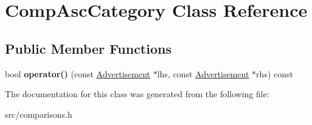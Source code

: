 \hypertarget{class_comp_asc_category}{}\section{Comp\+Asc\+Category Class Reference}
\label{class_comp_asc_category}
\subsection*{Public Member Functions}
\begin{DoxyCompactItemize}
\item 
\hypertarget{class_comp_asc_category_aa6b627570bde0d4080d3b78d3da91023}{}bool {\bfseries operator()} (const \hyperlink{class_advertisement}{Advertisement} $\ast$lhs, const \hyperlink{class_advertisement}{Advertisement} $\ast$rhs) const \label{class_comp_asc_category_aa6b627570bde0d4080d3b78d3da91023}

\end{DoxyCompactItemize}


The documentation for this class was generated from the following file\+:\begin{DoxyCompactItemize}
\item 
src/comparisons.\+h\end{DoxyCompactItemize}
